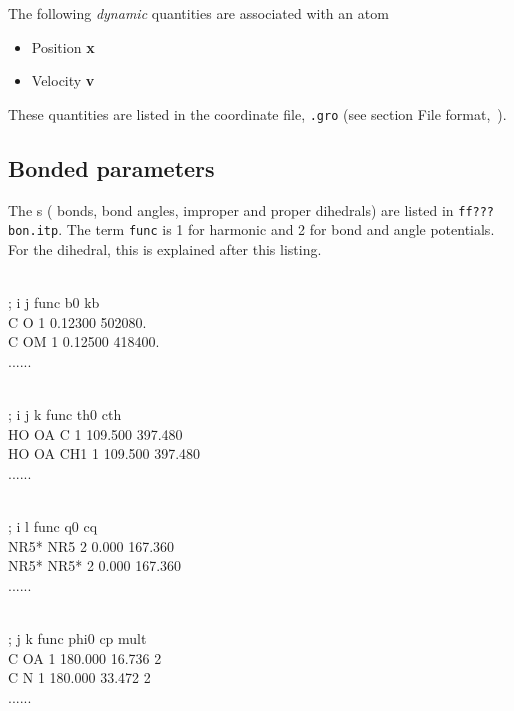 The following {\em dynamic} quantities are associated with an atom
\begin{itemize}
\item   Position {\bf x}
\item   Velocity {\bf v}
\end{itemize}
These quantities are listed in the coordinate file, {\tt *.gro}
(see section File format,~).

\subsection{Bonded parameters}
\label{subsec:bondparam}
The s ({\ie} bonds, bond angles, improper and proper
dihedrals) are listed in {\tt ff???bon.itp}. The term {\tt func} is 1 for
harmonic and 2 for  bond and angle potentials.
For the dihedral, this is explained after this listing.

\begin{tt}
[ bondtypes ]\\
  ; i    j func        b0          kb\\
    C    O    1   0.12300     502080.\\
    C   OM    1   0.12500     418400.\\
    ......\\
\end{tt}

\begin{tt}
[ angletypes ] \\
  ; i    j    k func       th0         cth\\
   HO   OA    C    1   109.500     397.480\\
   HO   OA  CH1    1   109.500     397.480\\
   ......\\
\end{tt}

\begin{tt}
[ dihedraltypes ] \\
  ; i    l func        q0          cq\\
 NR5*  NR5    2     0.000     167.360\\
 NR5* NR5*    2     0.000     167.360\\
 ......\\
\end{tt}

\begin{tt}
[ dihedraltypes ] \\
  ; j    k func      phi0          cp   mult\\
    C   OA    1   180.000      16.736      2\\
    C    N    1   180.000      33.472      2\\
    ......\\
\end{tt}

